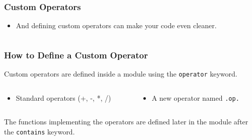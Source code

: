 \begin{frame}[fragile]
  \frametitle{Custom Operators}
        \begin{itemize}
        \item And defining custom operators can make your code even cleaner.
      \end{itemize}
  \begin{columns}[T]
    \begin{column}{0.5\textwidth}
          
    \end{column}

    \begin{column}{0.5\textwidth}
    
    \end{column}
  \end{columns}
\end{frame}


\begin{frame}[fragile]
  \frametitle{How to Define a Custom Operator}
  Custom operators are defined inside a module using the \texttt{operator} keyword.
  \vspace*{2mm}

  \begin{columns}[T]
    \begin{column}{0.5\textwidth}
      \begin{itemize}
            \item Standard operators (+, -, *, /) 
      \end{itemize}
    \end{column}

    \begin{column}{0.5\textwidth}
      \begin{itemize}
            \item A new operator named \texttt{.op.} 
      \end{itemize}    \end{column}
  \end{columns}

  \vspace*{2mm}
  The functions implementing the operators are defined later in the module after the \texttt{contains} keyword.
\end{frame}



